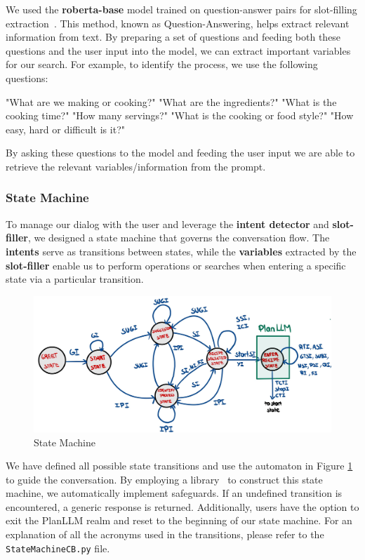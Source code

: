 \documentclass[runningheads]{llncs}
\begin{document}
We used the \textbf{roberta-base} model trained on question-answer pairs for slot-filling extraction~\cite{slot}. This method, known as Question-Answering, helps extract relevant information from text. By preparing a set of questions and feeding both these questions and the user input into the model, we can extract important variables for our search. For example, to identify the process, we use the following questions:

\hspace{2.5cm} %
\begin{minipage}{1.2\textwidth} %
\begin{dialogue}
 "What are we making or cooking?"
 "What are the ingredients?"
 "What is the cooking time?"
 "How many servings?"
 "What is the cooking or food style?"
 "How easy, hard or difficult is it?"\\[5pt]
\end{dialogue}
\end{minipage}

By asking these questions to the model and feeding the user input we are able to retrieve the relevant variables/information from the prompt.
\subsubsection{State Machine}
To manage our dialog with the user and leverage the \textbf{intent detector} and \textbf{slot-filler}, we designed a state machine that governs the conversation flow. The \textbf{intents} serve as transitions between states, while the \textbf{variables} extracted by the \textbf{slot-filler} enable us to perform operations or searches when entering a specific state via a particular transition.

\begin{figure}[!htbp]
    \center
    \includegraphics[scale=0.15]{images/automata}
    \caption{State Machine}
    \label{autom}
\end{figure}
We have defined all possible state transitions and use the automaton in Figure \ref{autom} to guide the conversation. By employing a library~\cite{autolib} to construct this state machine, we automatically implement safeguards. If an undefined transition is encountered, a generic response is returned. Additionally, users have the option to exit the PlanLLM realm and reset to the beginning of our state machine. For an explanation of all the acronyms used in the transitions, please refer to the \texttt{StateMachineCB.py} file.
\newpage
\end{document}
